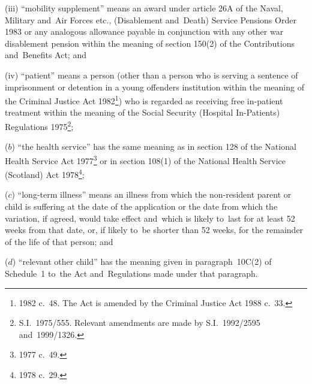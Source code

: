 \documentclass[12pt,a4paper]{article}
\begin{document}
\begin{enumerate}
\begin{enumerate}
(iii) “mobility supplement” means an award under article 26A of the Naval, Military and~Air Forces etc., (Disablement and~Death) Service Pensions Order 1983 or any analogous allowance payable in conjunction with any other war disablement pension within the meaning of section 150(2) of the Contributions and~Benefits Act; and

(iv) “patient” means a person (other than a person who is serving a sentence of imprisonment or detention in a young offenders institution within the meaning of the Criminal Justice Act 1982\footnote{1982 c.\ 48. The Act is amended by the Criminal Justice Act 1988 c.\ 33.}) who is regarded as receiving free in-patient treatment within the meaning of the Social Security (Hospital In-Patients) Regulations 1975\footnote{S.I.\ 1975/555. Relevant amendments are made by S.I.\ 1992/2595 and~1999/1326.};
\end{enumerate}

($b$) “the health service” has the same meaning as in section 128 of the National Health Service Act 1977\footnote{1977 c.\ 49.} or in section 108(1) of the National Health Service (Scotland) Act 1978\footnote{1978 c.\ 29.};

($c$) “long-term illness” means an illness from which the non-resident parent or child is suffering at the date of the application or the date from which the variation, if agreed, would take effect and~which is likely to~last for at least 52 weeks from that date, or, if likely to~be shorter than 52 weeks, for the remainder of the life of that person; and

($d$) “relevant other child” has the meaning given in paragraph~10C(2) of Schedule~1 to~the Act and~Regulations made under that paragraph.
\end{enumerate}

\end{document}
